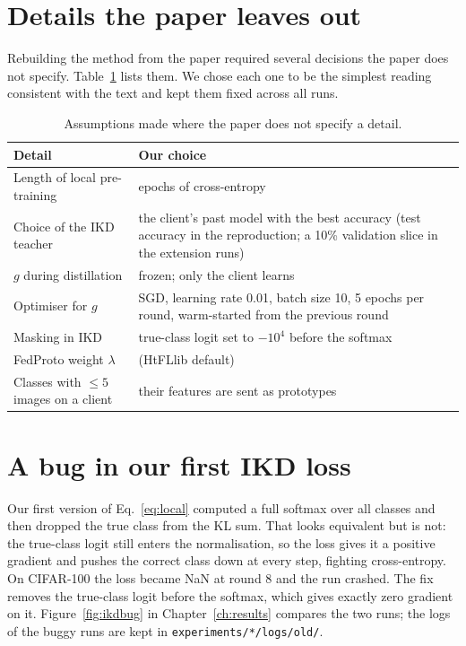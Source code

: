 \section{Details the paper leaves out}

Rebuilding the method from the paper required several decisions the paper does not specify. Table~\ref{tab:assumptions} lists them. We chose each one to be the simplest reading consistent with the text and kept them fixed across all runs.

\begin{table}[htbp]
\centering
\caption[Assumptions where the paper gives no detail]{Assumptions made where the paper does not specify a detail.}
\label{tab:assumptions}
\small
\begin{tabularx}{\textwidth}{>{\raggedright\arraybackslash}p{4.6cm}>{\raggedright\arraybackslash}X}
\toprule
Detail & Our choice \\
\midrule
Length of local pre-training & 5 epochs of cross-entropy \\
Choice of the IKD teacher & the client's past model with the best accuracy (test accuracy in the reproduction; a 10\% validation slice in the extension runs) \\
$g$ during distillation & frozen; only the client learns \\
Optimiser for $g$ & SGD, learning rate 0.01, batch size 10, 5 epochs per round, warm-started from the previous round \\
Masking in IKD & true-class logit set to $-10^4$ before the softmax \\
FedProto weight $\lambda$ & 10 (HtFLlib default) \\
Classes with $\le 5$ images on a client & their features are sent as prototypes \\
\bottomrule
\end{tabularx}
\end{table}

\section{A bug in our first IKD loss}
\label{sec:i-bug}

Our first version of Eq.~\eqref{eq:local} computed a full softmax over all classes and then dropped the true class from the KL sum. That looks equivalent but is not: the true-class logit still enters the normalisation, so the loss gives it a positive gradient and pushes the correct class down at every step, fighting cross-entropy. On CIFAR-100 the loss became NaN at round 8 and the run crashed. The fix removes the true-class logit before the softmax, which gives exactly zero gradient on it. Figure~\ref{fig:ikdbug} in Chapter~\ref{ch:results} compares the two runs; the logs of the buggy runs are kept in \texttt{experiments/*/logs/old/}.

